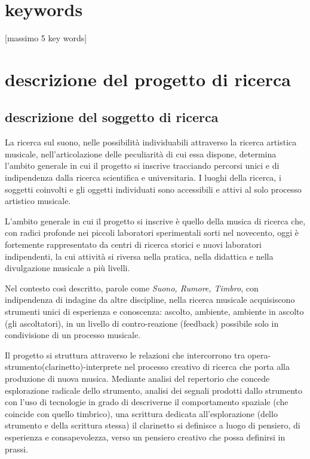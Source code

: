 \documentclass{gs-adonis}
\begin{document}
%
%


\section*{keywords}

[massimo 5 key words]


\section{descrizione del progetto di ricerca}%

\subsection{descrizione del soggetto di ricerca}%


La ricerca sul suono, nelle possibilità individuabili attraverso la ricerca
artistica musicale, nell'articolazione delle peculiarità di cui essa dispone,
determina l'ambito generale in cui il progetto si inscrive tracciando percorsi
unici e di indipendenza dalla ricerca scientifica e universitaria. I luoghi
della ricerca, i soggetti coinvolti e gli oggetti individuati sono accessibili
e attivi al solo processo artistico musicale.

L'ambito generale in cui il progetto si inscrive è quello della musica di
ricerca che, con radici profonde nei piccoli laboratori sperimentali sorti nel
novecento, oggi è fortemente rappresentato da centri di ricerca storici e
nuovi laboratori indipendenti, la cui attività si riversa nella pratica, nella
didattica e nella divulgazione musicale a più livelli.

Nel contesto così descritto, parole come \emph{Suono, Rumore, Timbro},
con indipendenza di indagine da altre discipline, nella ricerca musicale
acquisiscono strumenti unici di esperienza e conoscenza: ascolto, ambiente,
ambiente in ascolto (gli ascoltatori), in un livello di contro-reazione
(feedback) possibile solo in condivisione di un processo musicale.

Il progetto si struttura attraverso le relazioni che intercorrono tra 
opera-strumento(clarinetto)-interprete nel processo creativo di ricerca che
porta alla produzione di nuova musica. Mediante analisi del repertorio che
concede esplorazione radicale dello strumento, analisi dei segnali prodotti
dallo strumento con l'uso di tecnologie in grado di descriverne il
comportamento spaziale (che coincide con quello timbrico), una scrittura
dedicata all'esplorazione (dello strumento e della scrittura stessa) il
clarinetto si definisce a luogo di pensiero, di esperienza e
consapevolezza, verso un pensiero creativo che possa definirsi in prassi.
\end{document}
